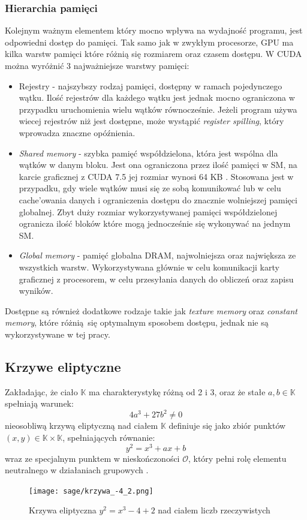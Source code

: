 \subsubsection{Hierarchia pamięci}
Kolejnym ważnym elementem który mocno wpływa na wydajność
programu, jest odpowiedni dostęp do pamięci.
Tak samo jak w zwykłym procesorze, GPU ma kilka warstw
pamięci które różnią się rozmiarem oraz czasem dostępu.
W CUDA można wyróżnić 3 najważniejsze warstwy pamięci:
\begin{itemize}
    \item Rejestry - najszybszy rodzaj pamięci, dostępny w ramach pojedynczego wątku.
    Ilość rejestrów dla każdego wątku jest jednak mocno ograniczona w przypadku
    uruchomienia wielu wątków równocześnie. Jeżeli program używa wiecej rejestrów niż jest dostępne,
    może wystąpić \textit{register spilling}, który wprowadza znaczne opóźnienia.
    \item \textit{Shared memory} - szybka pamięć współdzielona, która jest wspólna dla wątków w danym bloku. Jest ona ograniczona
    przez ilość pamięci w SM, na karcie graficznej z CUDA 7.5 jej rozmiar wynosi 64 KB \cite{CudaDeveloper}.
    Stosowana jest w przypadku, gdy wiele wątków musi się ze sobą komunikować lub w celu cache'owania danych
    i ograniczenia dostępu do znacznie wolniejszej pamięci globalnej.
    Zbyt duży rozmiar wykorzystywanej pamięci współdzielonej ogranicza ilość bloków które mogą jednocześnie się
    wykonywać na jednym SM.
    \item \textit{Global memory} - pamięć globalna DRAM, najwolniejsza oraz największa ze wszystkich warstw. Wykorzystywana głównie w celu
    komunikacji karty graficznej z procesorem, w celu przesyłania danych do obliczeń oraz zapisu wyników.
\end{itemize}
Dostępne są również dodatkowe rodzaje takie jak \textit{texture memory} oraz \textit{constant memory},
które różnią się optymalnym sposobem dostępu, jednak nie są wykorzystywane w tej pracy.

\subsection{Krzywe eliptyczne}
Zakładając, że ciało $\mathbb{K}$ ma charakterystykę różną od 2 i 3,
oraz że stałe $a, b \in \mathbb{K}$ spełniają warunek:
\[4a^3 + 27b^2 \neq 0\]
nieosobliwą krzywą eliptyczną nad ciałem $\mathbb{K}$ definiuje się jako zbiór punktów $(x,y) \in \mathbb{K} \times \mathbb{K}$,
spełniających równanie:
\[y^2 = x^3 + ax + b\]
wraz ze specjalnym punktem w nieskończoności $\mathcal{O}$, który pełni rolę elementu neutralnego
w działaniach grupowych
\cite{Stinson2021}.
\begin{figure}[H]
    \centering \texttt{[image: sage/krzywa\_-4\_2.png]}
    \caption{Krzywa eliptyczna $y^2=x^3-4+2$ nad ciałem liczb rzeczywistych}
\end{figure}

